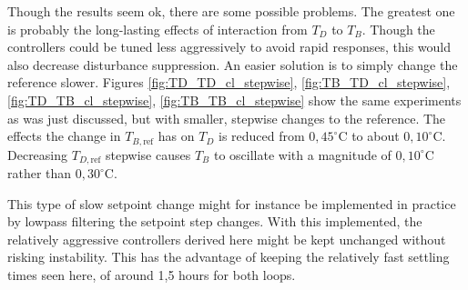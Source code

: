 \documentclass[12pt]{article}
\begin{document}
Though the results seem ok, there are some possible problems. The greatest one is probably the long-lasting effects of interaction from $T_D$ to $T_B$. Though the controllers could be tuned less aggressively to avoid rapid responses, this would also decrease disturbance suppression. An easier solution is to simply change the reference slower. Figures \ref{fig:TD_TD_cl_stepwise}, \ref{fig:TB_TD_cl_stepwise}, \ref{fig:TD_TB_cl_stepwise}, \ref{fig:TB_TB_cl_stepwise} show the same experiments as was just discussed, but with smaller, stepwise changes to the reference. The effects the change in $T_{B , \textrm{ref}}$ has on $T_D$ is reduced from $0,45^\circ$C to about $0,10^\circ$C. Decreasing $T_{D , \textrm{ref}}$ stepwise causes $T_B$ to oscillate with a magnitude of $0,10^\circ$C rather than $0,30^\circ$C.

This type of slow setpoint change might for instance be implemented in practice by lowpass filtering the setpoint step changes. With this implemented, the relatively aggressive controllers derived here might be kept unchanged without risking instability. This has the advantage of keeping the relatively fast settling times seen here, of around 1,5 hours for both loops.
\end{document}

